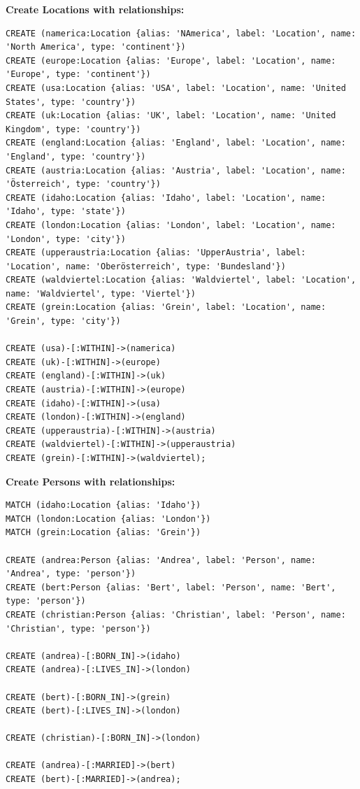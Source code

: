 \documentclass[14pt,a4paper]{extarticle}
\begin{document}
	\noindent \textbf{Create Locations with relationships:}
	\begin{lstlisting}[style=sql]
CREATE (namerica:Location {alias: 'NAmerica', label: 'Location', name: 'North America', type: 'continent'})
CREATE (europe:Location {alias: 'Europe', label: 'Location', name: 'Europe', type: 'continent'})
CREATE (usa:Location {alias: 'USA', label: 'Location', name: 'United States', type: 'country'})
CREATE (uk:Location {alias: 'UK', label: 'Location', name: 'United Kingdom', type: 'country'})
CREATE (england:Location {alias: 'England', label: 'Location', name: 'England', type: 'country'})
CREATE (austria:Location {alias: 'Austria', label: 'Location', name: 'Österreich', type: 'country'})
CREATE (idaho:Location {alias: 'Idaho', label: 'Location', name: 'Idaho', type: 'state'})
CREATE (london:Location {alias: 'London', label: 'Location', name: 'London', type: 'city'})
CREATE (upperaustria:Location {alias: 'UpperAustria', label: 'Location', name: 'Oberösterreich', type: 'Bundesland'})
CREATE (waldviertel:Location {alias: 'Waldviertel', label: 'Location', name: 'Waldviertel', type: 'Viertel'})
CREATE (grein:Location {alias: 'Grein', label: 'Location', name: 'Grein', type: 'city'})

CREATE (usa)-[:WITHIN]->(namerica)
CREATE (uk)-[:WITHIN]->(europe)
CREATE (england)-[:WITHIN]->(uk)
CREATE (austria)-[:WITHIN]->(europe)
CREATE (idaho)-[:WITHIN]->(usa)
CREATE (london)-[:WITHIN]->(england)
CREATE (upperaustria)-[:WITHIN]->(austria)
CREATE (waldviertel)-[:WITHIN]->(upperaustria)
CREATE (grein)-[:WITHIN]->(waldviertel);
	\end{lstlisting}

	\pagebreak

	\noindent \textbf{Create Persons with relationships:}
	\begin{lstlisting}[style=sql]
MATCH (idaho:Location {alias: 'Idaho'})
MATCH (london:Location {alias: 'London'})
MATCH (grein:Location {alias: 'Grein'})

CREATE (andrea:Person {alias: 'Andrea', label: 'Person', name: 'Andrea', type: 'person'})
CREATE (bert:Person {alias: 'Bert', label: 'Person', name: 'Bert', type: 'person'})
CREATE (christian:Person {alias: 'Christian', label: 'Person', name: 'Christian', type: 'person'})

CREATE (andrea)-[:BORN_IN]->(idaho)
CREATE (andrea)-[:LIVES_IN]->(london)

CREATE (bert)-[:BORN_IN]->(grein)
CREATE (bert)-[:LIVES_IN]->(london)

CREATE (christian)-[:BORN_IN]->(london)
	
CREATE (andrea)-[:MARRIED]->(bert)
CREATE (bert)-[:MARRIED]->(andrea);
	\end{lstlisting}
\end{document}
